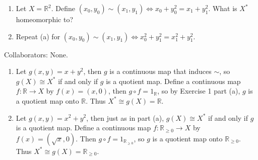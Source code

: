 \documentclass[10pt]{report}
\begin{document}
\pagebreak
\begin{exer}[\S 22, \#4]
\begin{enumerate}
	\item Let $X = \mathbb{R}^2$. Define $(x_0,y_0) \sim (x_1,y_1) \iff x_0+y_0^2=x_1+y_1^2$. What is $X^{*}$ homeomorphic to?
	\item Repeat (a) for $(x_0,y_0) \sim (x_1,y_1) \iff x_0^2+y_1^2=x_1^2+y_1^2$.
\end{enumerate}
\end{exer}
{\color{blue}Collaborators: None.}
\begin{enumerate}
	\item Let $g(x,y) = x+y^2$, then $g$ is a continuous map that induces $\sim$, so $g(X) \cong X^*$ if and only if $g$ is a quotient map. Define a continuous map $f:\mathbb{R}\to X$ by $f(x)=(x,0)$, then $g \circ f = 1_{\mathbb{R}}$, so by Exercise 1 part (a), $g$ is a quotient map onto $\mathbb{R}$. Thus $X^{*}\cong g(X) = \mathbb{R}$.

	\item Let $g(x,y)=x^2+y^2$, then just as in part (a), $g(X) \cong X^{*}$ if and only if $g$ is a quotient map. Define a continuous map $f:\mathbb{R}_{\geq 0}\to X$ by $f(x)=(\sqrt{x} ,0)$. Then $g \circ f=1_{\mathbb{R}_{\geq 0}}$, so $g$ is a quotient map onto $\mathbb{R}_{\geq 0}$. Thus $X^{*}\cong g(X)=\mathbb{R}_{\geq 0}$.
\end{enumerate}
\end{document}
